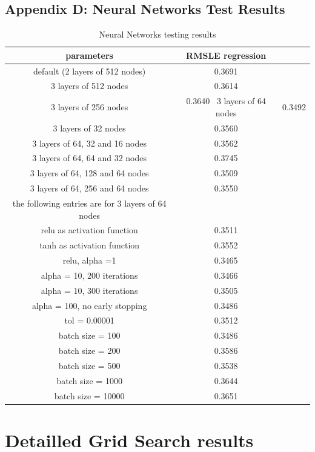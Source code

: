 \documentclass[a4paper]{article}
\begin{document}
\subsection{Appendix D: Neural Networks Test Results}
\begin{table}[h!]
    \centering
    \begin{tabular}{ccc}
        parameters & RMSLE regression\\
        \hline
        default (2 layers of 512 nodes) & 0.3691 \\
        3 layers of 512 nodes & 0.3614 \\
        3 layers of 256 nodes & 0.3640 \
        3 layers of 64 nodes & 0.3492 \\
        3 layers of 32 nodes & 0.3560 \\
        3 layers of 64, 32 and 16 nodes & 0.3562 \\
        3 layers of 64, 64 and 32 nodes & 0.3745 \\
        3 layers of 64, 128 and 64 nodes & 0.3509 \\
        3 layers of 64, 256 and 64 nodes & 0.3550 \\
        the following entries are for 3 layers of 64 nodes \\
        relu as activation function & 0.3511 \\
        tanh as activation function & 0.3552 \\
        relu, alpha =1 & 0.3465 \\
        alpha = 10, 200 iterations & 0.3466 \\
        alpha = 10, 300 iterations & 0.3505 \\
        alpha = 100, no early stopping & 0.3486 \\
        tol = 0.00001 & 0.3512 \\
        batch size = 100 & 0.3486 \\
        batch size = 200 & 0.3586 \\
        batch size = 500 & 0.3538 \\
        batch size = 1000 & 0.3644 \\
        batch size = 10000 & 0.3651 \\
        \hline
    \end{tabular}
    \caption{Neural Networks testing results}
    \label{results}
\end{table}

\section{Detailled Grid Search results}
\label{results_appendix}
\end{document}
